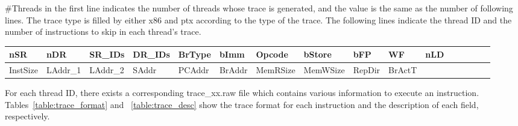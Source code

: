 \#Threads in the first line indicates the number of threads whose trace is 
generated, and the value is the same as the number of following lines. The trace
type is filled by either x86 and ptx according to the type of the trace. The following
lines indicate the thread ID and the number of instructions to skip in each thread's trace.

\begin{table*}[htb]
\begin{footnotesize}
\begin{center}
\caption{MacSim trace format.}
\label{table:trace_format}
\begin{tabular}{|l|l|l|l|l|l|l|l|l|l|l|l|l|l|l|l|} 
\hline
nSR & nDR & SR\_IDs & DR\_IDs & BrType & bImm & Opcode & bStore & bFP & WF & nLD  \\ \hline \hline
InstSize & LAddr\_1 & LAddr\_2 & SAddr & PCAddr & BrAddr & MemRSize & MemWSize & RepDir & BrActT & \\ \hline
\end{tabular}
\end{center}
\end{footnotesize}
\end{table*}

For each thread ID, there exists a corresponding trace\_xx.raw file which
contains various information to execute an instruction.
Tables~\ref{table:trace_format} and ~\ref{table:trace_desc} show the trace
format for each instruction and the description of each field, respectively.


